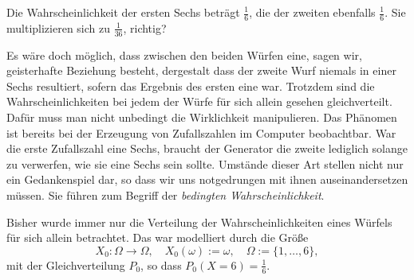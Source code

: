 Die Wahrscheinlichkeit der ersten Sechs beträgt $\tfrac{1}{6}$,
die der zweiten ebenfalls $\tfrac{1}{6}$. Sie multiplizieren sich
zu $\tfrac{1}{36}$, richtig?

Es wäre doch möglich, dass zwischen den beiden Würfen eine,
sagen wir, geisterhafte Beziehung besteht, dergestalt dass
der zweite Wurf niemals in einer Sechs resultiert, sofern das
Ergebnis des ersten eine war. Trotzdem sind die Wahrscheinlichkeiten bei
jedem der Würfe für sich allein gesehen gleichverteilt. Dafür muss man
nicht unbedingt die Wirklichkeit manipulieren. Das Phänomen ist bereits
bei der Erzeugung von Zufallszahlen im Computer beobachtbar. War die
erste Zufallszahl eine Sechs, braucht der Generator die zweite lediglich
solange zu verwerfen, wie sie eine Sechs sein sollte. Umstände dieser
Art stellen nicht nur ein Gedankenspiel dar, so dass wir uns notgedrungen
mit ihnen auseinandersetzen müssen. Sie führen zum Begriff der
\emph{bedingten Wahrscheinlichkeit}.

Bisher wurde immer nur die Verteilung der Wahrscheinlichkeiten eines
Würfels für sich allein betrachtet. Das war modelliert durch die Größe
\[X_0\colon\Omega\to\Omega,\quad X_0(\omega):=\omega,\quad \Omega := \{1,\ldots,6\},\]
mit der Gleichverteilung $P_0$, so dass $P_0(X=6)=\tfrac{1}{6}$.

